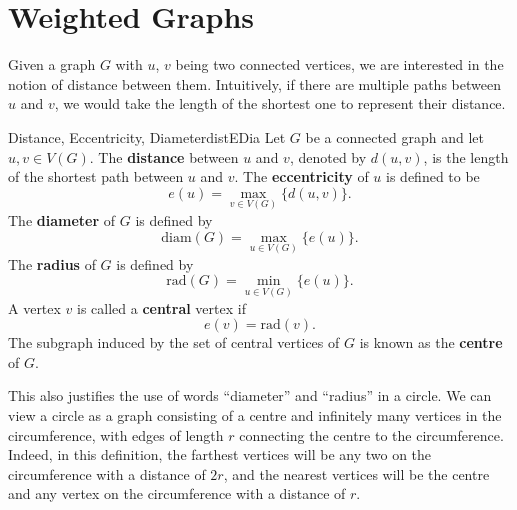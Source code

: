 \documentclass[math]{amznotes}
\theoremstyle{remark}
\newcommand{\0}{\mathbf{0}}
\newcommand{\1}{\mathbf{1}}
\begin{document}
\section{Weighted Graphs}
Given a graph $G$ with $u$, $v$ being two connected vertices, we are interested in the notion of distance between them. Intuitively, if there are multiple paths between $u$ and $v$, we would take the length of the shortest one to represent their distance.
\begin{dfnbox}{Distance, Eccentricity, Diameter}{distEDia}
    Let $G$ be a connected graph and let $u, v \in V(G)$. The {\color{red} \textbf{distance}} between $u$ and $v$, denoted by $d(u, v)$, is the length of the shortest path between $u$ and $v$. The {\color{red} \textbf{eccentricity}} of $u$ is defined to be
    \begin{equation*}
        e(u) = \max_{v \in V(G)}\{d(u, v)\}.
    \end{equation*}
    The {\color{red} \textbf{diameter}} of $G$ is defined by
    \begin{equation*}
        \mathrm{diam}(G) = \max_{u \in V(G)}\{e(u)\}.
    \end{equation*}
    The {\color{red} \textbf{radius}} of $G$ is defined by
    \begin{equation*}
        \mathrm{rad}(G) = \min_{u \in V(G)}\{e(u)\}.
    \end{equation*}
    A vertex $v$ is called a {\color{red} \textbf{central}} vertex if
    \begin{equation*}
        e(v) = \mathrm{rad}(v).
    \end{equation*}
    The subgraph induced by the set of central vertices of $G$ is known as the {\color{red} \textbf{centre}} of $G$.
\end{dfnbox}
This also justifies the use of words ``diameter'' and ``radius'' in a circle. We can view a circle as a graph consisting of a centre and infinitely many vertices in the circumference, with edges of length $r$ connecting the centre to the circumference. Indeed, in this definition, the farthest vertices will be any two on the circumference with a distance of $2r$, and the nearest vertices will be the centre and any vertex on the circumference with a distance of $r$.
\end{document}
